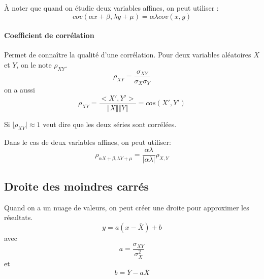 \documentclass[10pt,a4paper,french]{article}
\begin{document}
À noter que quand on étudie deux variables affines, on peut utiliser : \[ cov(\alpha x + \beta, \lambda y + \mu) = \alpha \lambda cov(x, y) \]

\paragraph{Coefficient de corrélation}
Permet de connaître la qualité d'une corrélation. Pour deux variables aléatoires $X$ et $Y$, on le note $\rho_{X Y}$.
\[ \rho_{X Y} = \frac{\sigma_{X Y}}{\sigma_X \sigma_Y} \]
on a aussi \[ \rho_{X Y} = \frac{<X', Y'>}{\Vert X \Vert \Vert Y \Vert} = cos(X', Y') \]

Si $\vert \rho_{X Y} \vert \approx 1$ veut dire que les deux séries sont corrélées.

Dans le cas de deux variables affines, on peut utiliser: \[ \rho_{\alpha X + \beta, \lambda Y + \mu} = \frac{\alpha \lambda}{\vert \alpha \lambda \vert} \rho_{X,Y} \]

\subsection{Droite des moindres carrés}

Quand on a un nuage de valeurs, on peut créer une droite pour approximer les résultats.
\[ y = a (x - \overline{X}) + b \]
avec \[ a = \frac{\sigma_{X Y}}{\sigma_X^2} \]
et \[ b = \overline{Y} - a \overline{X} \]
\end{document}
